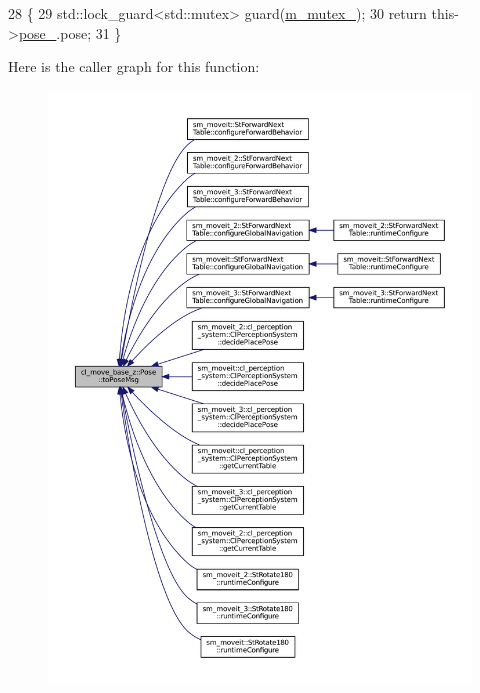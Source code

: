 \begin{DoxyCode}
28     \{
29         std::lock\_guard<std::mutex> guard(\hyperlink{classcl__move__base__z_1_1Pose_a73ed2daba3e473e156cab751fb37b58f}{m\_mutex\_});
30         \textcolor{keywordflow}{return} this->\hyperlink{classcl__move__base__z_1_1Pose_a9da7acf880968a3c220b8436fd0bb6ef}{pose\_}.pose;
31     \}
\end{DoxyCode}
Here is the caller graph for this function\+:
\nopagebreak
\begin{figure}[H]
\begin{center}
\leavevmode
\includegraphics[width=350pt]{classcl__move__base__z_1_1Pose_a9faf8c6b437ff6b19c8bddd692908dca_icgraph}
\end{center}
\end{figure}
\mbox{\label{classcl__move__base__z_1_1Pose_a63887a88c1ac6e9a4a71b8d7d11aed6c}} 
